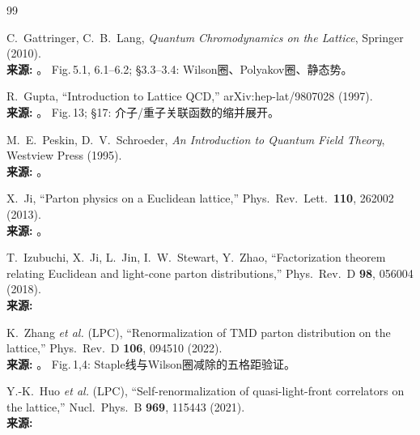 \documentclass[12pt,a4paper]{ctexart}
\begin{document}
\begingroup
\RaggedRight
\begin{thebibliography}{99}

C.~Gattringer, C.~B.~Lang,
\textit{Quantum Chromodynamics on the Lattice}, Springer (2010).
\\{\small\textbf{来源:} }。
Fig.\,5.1, 6.1--6.2; §3.3--3.4: Wilson圈、Polyakov圈、静态势。

R.~Gupta, ``Introduction to Lattice QCD,'' arXiv:hep-lat/9807028 (1997).
\\{\small\textbf{来源:} }。
Fig.\,13; §17: 介子/重子关联函数的缩并展开。

M.~E.~Peskin, D.~V.~Schroeder,
\textit{An Introduction to Quantum Field Theory}, Westview Press (1995).
\\{\small\textbf{来源:} }。

X.~Ji, ``Parton physics on a Euclidean lattice,''
Phys.\ Rev.\ Lett.\ \textbf{110}, 262002 (2013).
\\{\small\textbf{来源:} }。

T.~Izubuchi, X.~Ji, L.~Jin, I.~W.~Stewart, Y.~Zhao,
``Factorization theorem relating Euclidean and light-cone parton distributions,''
Phys.\ Rev.\ D \textbf{98}, 056004 (2018).
\\{\small\textbf{来源:} }

K.~Zhang \textit{et al.} (LPC),
``Renormalization of TMD parton distribution on the lattice,''
Phys.\ Rev.\ D \textbf{106}, 094510 (2022).
\\{\small\textbf{来源:} }。
Fig.\,1,4: Staple线与Wilson圈减除的五格距验证。

Y.-K.~Huo \textit{et al.} (LPC),
``Self-renormalization of quasi-light-front correlators on the lattice,''
Nucl.\ Phys.\ B \textbf{969}, 115443 (2021).
\\{\small\textbf{来源:} }


\end{thebibliography}
\end{document}
